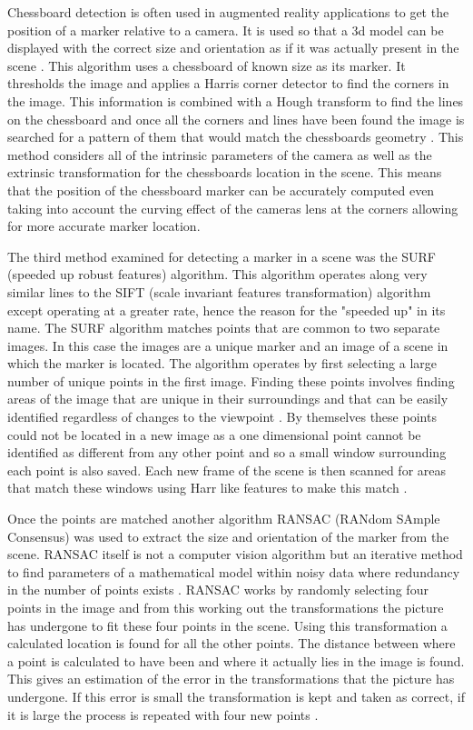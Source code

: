 Chessboard detection is often used in augmented reality applications to get the position of a marker relative to a camera.  It is used so that a 3d model can be displayed with the correct size and orientation as if it was actually present in the scene \cite{augmented}. This algorithm uses a chessboard of known size as its marker. It thresholds the image and applies a Harris corner detector to find the corners in the image. This information is combined with a Hough transform to find the lines on the chessboard and once all the corners and lines have been found the image is searched for a pattern of them that would match the chessboards geometry \cite{chessboard}. This method considers all of the intrinsic parameters of the camera as well as the extrinsic transformation for the chessboards location in the scene. This means that the position of the chessboard marker can be accurately computed even taking into  account the curving effect of the cameras lens at the corners allowing for more accurate marker location. 

The third method examined for detecting a marker in a scene was the SURF (speeded up robust features) algorithm. This algorithm operates along very similar lines to the SIFT (scale invariant features transformation) algorithm except operating at a greater rate, hence the reason for the "speeded up" in its name. The SURF algorithm matches points that are common to two separate images. In this case the images are a unique marker and an image of a scene in which the marker is located. The algorithm operates by first selecting a large number of unique points in the first image. Finding these points involves finding areas of the image that are unique in their surroundings and that can be easily identified regardless of changes to the viewpoint \cite{surf}. By themselves these points could not be located in a new image as a one dimensional point cannot be identified as different from any other point and so a small window surrounding each point is also saved. Each new frame of the scene is then scanned for areas that match these windows using Harr like features to make this match \cite{haar_like}.

Once the points are matched another algorithm RANSAC (RANdom SAmple Consensus) was used to extract the size and orientation of the marker from the scene. RANSAC itself is not a computer vision algorithm but an iterative method to find parameters of a mathematical model within noisy data where redundancy in the number of points exists \cite{cosc428}. RANSAC works by randomly selecting four points in the image and from this working out the transformations the picture has undergone to fit these four points in the scene. Using this transformation a calculated location is found for all the other points. The distance between where a point is calculated to have been and where it actually lies in the image is found. This gives an estimation of the error in the transformations that the picture has undergone. If this error is small the transformation is kept and taken as correct, if it is large the process is repeated with four new points \cite{ransac}.